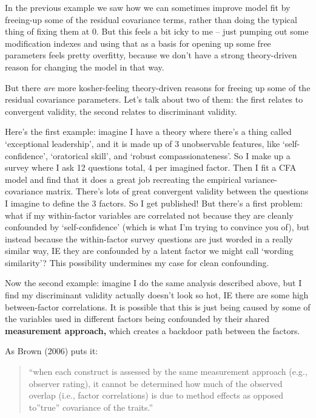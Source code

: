 \documentclass[
  letterpaper,
  DIV=11,
  numbers=noendperiod]{scrreprt}
\begin{document}
In the previous example we saw how we can sometimes improve model fit by
freeing-up some of the residual covariance terms, rather than doing the
typical thing of fixing them at 0. But this feels a bit icky to me --
just pumping out some modification indexes and using that as a basis for
opening up some free parameters feels pretty overfitty, because we don't
have a strong theory-driven reason for changing the model in that way.

But there \emph{are} more kosher-feeling theory-driven reasons for
freeing up some of the residual covariance parameters. Let's talk about
two of them: the first relates to convergent validity, the second
relates to discriminant validity.

Here's the first example: imagine I have a theory where there's a thing
called `exceptional leadership', and it is made up of 3 unobservable
features, like `self-confidence', `oratorical skill', and `robust
compassionateness'. So I make up a survey where I ask 12 questions
total, 4 per imagined factor. Then I fit a CFA model and find that it
does a great job recreating the empirical variance-covariance matrix.
There's lots of great convergent validity between the questions I
imagine to define the 3 factors. So I get published! But there's a first
problem: what if my within-factor variables are correlated not because
they are cleanly confounded by `self-confidence' (which is what I'm
trying to convince you of), but instead because the within-factor survey
questions are just worded in a really similar way, IE they are
confounded by a latent factor we might call `wording similarity'? This
possibility undermines my case for clean confounding.

Now the second example: imagine I do the same analysis described above,
but I find my discriminant validity actually doesn't look so hot, IE
there are some high between-factor correlations. It is possible that
this is just being caused by some of the variables used in different
factors being confounded by their shared \textbf{measurement approach,}
which creates a backdoor path between the factors.

As Brown (2006) puts it:

\begin{quote}
``when each construct is assessed by the same measurement approach
(e.g., observer rating), it cannot be determined how much of the
observed overlap (i.e., factor correlations) is due to method effects as
opposed to''true'' covariance of the traits.''
\end{quote}
\end{document}
